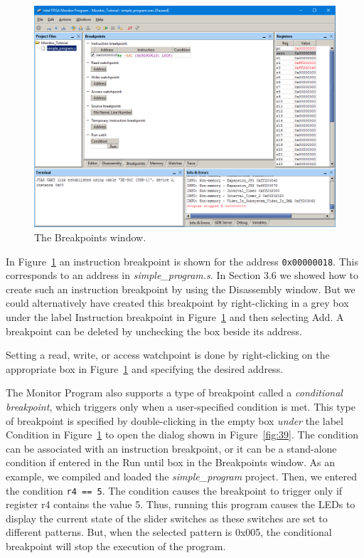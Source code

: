 \documentclass[11pt, twoside, pdftex]{article}
\begin{document}
\begin{figure}[H]
   \begin{center}
      \includegraphics[scale=0.6]{screenshots/figure38.png}
   \end{center}
   \caption{The Breakpoints window.} 
	 \label{fig:38}
\end{figure}

In Figure~\ref{fig:38} an instruction breakpoint is shown for the 
address \texttt{0x00000018}. This corresponds to an address in
{\it simple\_program.s}. 
In Section 3.6 we showed how to create such an instruction
breakpoint by using the Disassembly window. But we could
alternatively have created this breakpoint by right-clicking in
a grey box under the label {\sf Instruction breakpoint} in 
Figure~\ref{fig:38} and then selecting {\sf Add}. A breakpoint can be
deleted by unchecking the box beside its address.

Setting a read, write, or access watchpoint is done by
right-clicking on the appropriate box in Figure~\ref{fig:38} and specifying
the desired address.

The Monitor Program also supports a type of breakpoint called a
{\it conditional breakpoint}, which triggers only when a 
user-specified condition is met. This type of breakpoint is
specified by double-clicking in the empty box {\it under} the 
label {\sf Condition} in Figure~\ref{fig:38} to open the dialog shown in 
Figure~\ref{fig:39}. The condition can be associated with an instruction
breakpoint, or it can be a stand-alone condition if entered in
the {\sf Run until} box in the Breakpoints window. 
As an example, we compiled and loaded the {\it simple\_program}
project. Then, we entered the condition \texttt{r4 == 5}. The
condition causes the breakpoint to trigger only if register
r4 contains the value 5. Thus, running this program causes the 
LEDs to display the current state of the slider switches as these
switches are set to different patterns. But, when the selected
pattern is 0x005, the conditional breakpoint will stop the
execution of the program.
\end{document}
